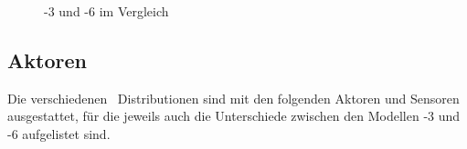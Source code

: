 \begin{figure}[htb]
  \centering
  \hfill
  \caption{-3 und -6 im Vergleich\cite{cob_media}}
  \label{fig:vgl3336}
\end{figure}

\subsection{Aktoren}

Die verschiedenen \cob\ Distributionen sind mit den folgenden Aktoren und Sensoren
ausgestattet, für die jeweils auch die Unterschiede zwischen den Modellen -3 und
-6 aufgelistet sind.

